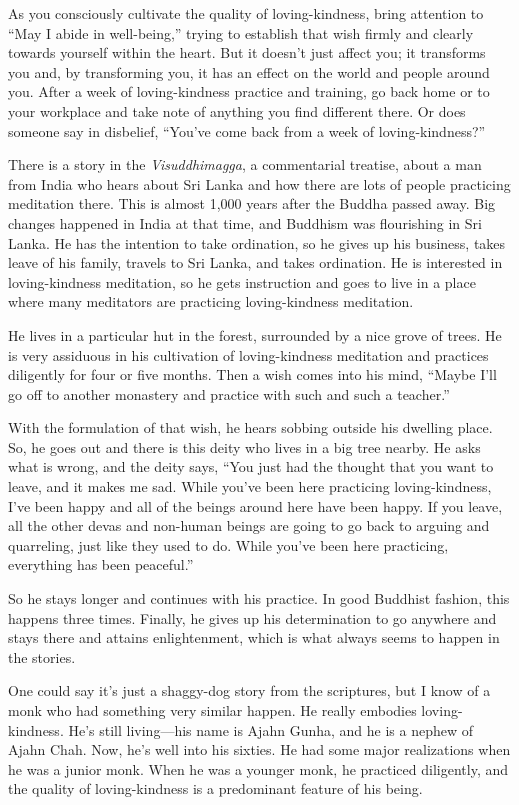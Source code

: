 As you consciously cultivate the quality of loving-kindness, bring
attention to “May I abide in well-being,” trying to establish that wish
firmly and clearly towards yourself within the heart. But it doesn’t
just affect you; it transforms you and, by transforming you, it has an
effect on the world and people around you. After a week of
loving-kindness practice and training, go back home or to your workplace
and take note of anything you find different there. Or does someone say
in disbelief, “You’ve come back from a week of loving-kindness?”

There is a story in the \emph{Visuddhimagga}, a commentarial treatise,
about a man from India who hears about Sri Lanka and how there are lots
of people practicing meditation there. This is almost 1,000 years after
the Buddha passed away. Big changes happened in India at that time, and
Buddhism was flourishing in Sri Lanka. He has the intention to take
ordination, so he gives up his business, takes leave of his family,
travels to Sri Lanka, and takes ordination. He is interested in
loving-kindness meditation, so he gets instruction and goes to live in a
place where many meditators are practicing loving-kindness meditation.

He lives in a particular hut in the forest, surrounded by a nice grove
of trees. He is very assiduous in his cultivation of loving-kindness
meditation and practices diligently for four or five months. Then a wish
comes into his mind, “Maybe I’ll go off to another monastery and
practice with such and such a teacher.”

With the formulation of that wish, he hears sobbing outside his dwelling
place. So, he goes out and there is this deity who lives in a big tree
nearby. He asks what is wrong, and the deity says, “You just had the
thought that you want to leave, and it makes me sad. While you’ve been
here practicing loving-kindness, I’ve been happy and all of the beings
around here have been happy. If you leave, all the other devas and
non-human beings are going to go back to arguing and quarreling, just
like they used to do. While you’ve been here practicing, everything has
been peaceful.”

So he stays longer and continues with his practice. In good Buddhist
fashion, this happens three times. Finally, he gives up his
determination to go anywhere and stays there and attains enlightenment,
which is what always seems to happen in the stories.

One could say it’s just a shaggy-dog story from the scriptures, but I
know of a monk who had something very similar happen. He really embodies
loving-kindness. He’s still living—his name is Ajahn Gunha, and he is a
nephew of Ajahn Chah. Now, he’s well into his sixties. He had some major
realizations when he was a junior monk. When he was a younger monk, he
practiced diligently, and the quality of loving-kindness is a
predominant feature of his being.


